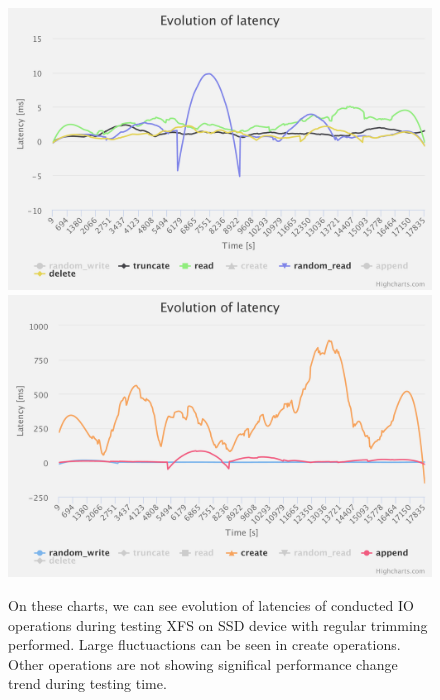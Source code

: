 \documentclass[
  color, %
  table, %
  lof,   %
  lot,   %
]{fithesis3}
\begin{document}
\begin{figure}[!htb]
    \centering
   \begin{minipage}{\textwidth}
        \centering
        \includegraphics[width=\textwidth]{../charts/SSD_xfs_trim/1}
        \includegraphics[width=\textwidth]{../charts/SSD_xfs_trim/2}
                \caption[Evolution of latencies of XFS during testing on SSD with regular trimming]{On these charts, we can see evolution of latencies of conducted IO operations during testing XFS on SSD device with regular trimming performed. Large fluctuactions can be seen in create operations. Other operations are not showing significal performance change trend during testing time.}
\label{fig:lats_xfs_ssd_trim}

    \end{minipage}
\end{figure}

\clearpage
\end{document}
